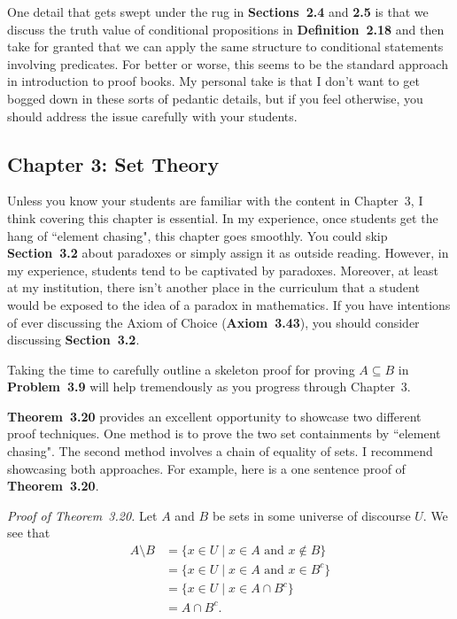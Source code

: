 \documentclass[11pt]{article}%
\newcommand{\blankline}{\pagebreak[2]\vspace{.5\baselineskip}}
\begin{document}
\blankline

One detail that gets swept under the rug in \textbf{Sections~2.4} and \textbf{2.5} is that we discuss the truth value of conditional propositions in \textbf{Definition~2.18} and then take for granted that we can apply the same structure to conditional statements involving predicates. For better or worse, this seems to be the standard approach in introduction to proof books.  My personal take is that I don't want to get bogged down in these sorts of pedantic details, but if you feel otherwise, you should address the issue carefully with your students.


\subsection*{Chapter 3: Set Theory}

Unless you know your students are familiar with the content in Chapter~3, I think covering this chapter is essential.  In my experience, once students get the hang of ``element chasing", this chapter goes smoothly.  You could skip \textbf{Section~3.2} about paradoxes or simply assign it as outside reading.  However, in my experience, students tend to be captivated by paradoxes.  Moreover, at least at my institution, there isn't another place in the curriculum that a student would be exposed to the idea of a paradox in mathematics.  If you have intentions of ever discussing the Axiom of Choice (\textbf{Axiom~3.43}), you should consider discussing \textbf{Section~3.2}.

\blankline

Taking the time to carefully outline a skeleton proof for proving $A\subseteq B$ in \textbf{Problem~3.9} will help tremendously as you progress through Chapter~3. 

\blankline

\textbf{Theorem~3.20} provides an excellent opportunity to showcase two different proof techniques.  One method is to prove the two set containments by ``element chasing".  The second method involves a chain of equality of sets.  I recommend showcasing both approaches.  For example, here is a one sentence proof of \textbf{Theorem~3.20}.

\blankline

\emph{Proof of Theorem~3.20.} Let $A$ and $B$ be sets in some universe of discourse $U$. We see that
\begin{align*}
A\setminus B & = \{x\in U\mid x\in A \text{ and } x\notin B\}\\
& = \{x\in U\mid x\in A \text{ and } x\in B^c\}\\
& = \{x\in U\mid x\in A \cap B^c\}\\
& = A\cap B^c. 
\end{align*}
\vspace{-2em}
 
\end{document}
